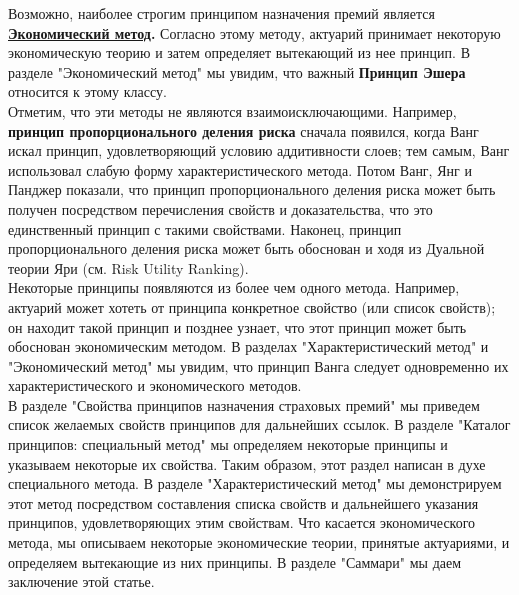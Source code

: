 \documentclass[12pt,a4paper]{article}
\begin{document}
Возможно, наиболее строгим принципом назначения премий является  {\bf \underline {Экономический метод}.} Согласно этому методу, актуарий принимает некоторую экономическую теорию и затем определяет вытекающий  из нее принцип. В разделе "Экономический метод"  мы увидим, что важный {\bf Принцип Эшера} относится к этому классу.\\
Отметим, что эти методы не являются взаимоисключающими. Например, {\bf принцип пропорционального деления риска}
сначала появился, когда Ванг искал принцип, удовлетворяющий условию аддитивности слоев; тем самым, Ванг использовал слабую форму характеристического метода. Потом Ванг, Янг и Панджер показали, что принцип пропорционального деления риска может быть получен посредством перечисления свойств и доказательства, что это единственный принцип с такими свойствами. Наконец, принцип пропорционального деления риска может быть обоснован и ходя из Дуальной теории Яри (см. Risk Utility Ranking).\\
Некоторые принципы появляются из более чем одного метода. Например, актуарий может хотеть от принципа конкретное свойство (или список свойств); он находит такой принцип и позднее узнает, что этот принцип может быть обоснован экономическим методом. В разделах "Характеристический метод" и "Экономический метод" мы увидим, что принцип Ванга следует одновременно их характеристического и экономического методов.\\
В разделе "Свойства принципов назначения страховых премий" мы приведем список желаемых свойств принципов для дальнейших ссылок. В разделе "Каталог принципов: специальный метод" мы определяем некоторые принципы и указываем некоторые их свойства. Таким образом, этот раздел написан в духе специального метода. В разделе "Характеристический метод" мы демонстрируем этот метод посредством составления списка свойств и дальнейшего указания принципов, удовлетворяющих  этим свойствам. Что касается экономического метода, мы описываем некоторые экономические теории, принятые актуариями,  и определяем вытекающие из них принципы. В разделе "Саммари" мы даем заключение  этой статье.
\end{document}
